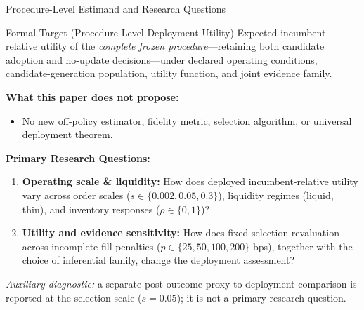 \documentclass[10pt,aspectratio=169]{beamer}
\begin{document}
\begin{frame}{Procedure-Level Estimand and Research Questions}
  \footnotesize
  \begin{block}{Formal Target (Procedure-Level Deployment Utility)}
    Expected incumbent-relative utility of the \emph{complete frozen procedure}---retaining both candidate adoption and no-update decisions---under declared operating conditions, candidate-generation population, utility function, and joint evidence family.
  \end{block}

  \vspace{0.3em}
  \textbf{What this paper does not propose:}
  \begin{itemize}
    \item No new off-policy estimator, fidelity metric, selection algorithm, or universal deployment theorem.
  \end{itemize}

  \vspace{0.3em}
  \textbf{Primary Research Questions:}
  \begin{enumerate}
    \item \textbf{Operating scale \& liquidity:} How does deployed incumbent-relative utility vary across order scales ($s \in \{0.002, 0.05, 0.3\}$), liquidity regimes (liquid, thin), and inventory responses ($\rho \in \{0,1\}$)?
    \item \textbf{Utility and evidence sensitivity:} How does fixed-selection revaluation across incomplete-fill penalties ($p \in \{25, 50, 100, 200\}$ bps), together with the choice of inferential family, change the deployment assessment?
  \end{enumerate}
  \vspace{0.2em}
  \small\emph{Auxiliary diagnostic:} a separate post-outcome proxy-to-deployment comparison is reported at the selection scale ($s=0.05$); it is not a primary research question.
\end{frame}
\end{document}
